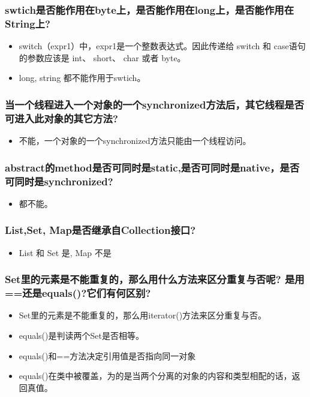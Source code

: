 \documentclass[9pt, b5paper]{article}
\begin{document}
\subsubsection{swtich是否能作用在byte上，是否能作用在long上，是否能作用在String上?}
\label{sec-1-1-42}
\begin{itemize}
\item switch（expr1）中，expr1是一个整数表达式。因此传递给 switch 和 case语句的参数应该是 int、 short、 char 或者 byte。
\item long, string 都不能作用于swtich。
\end{itemize}
\subsubsection{当一个线程进入一个对象的一个synchronized方法后，其它线程是否可进入此对象的其它方法?}
\label{sec-1-1-43}
\begin{itemize}
\item 不能，一个对象的一个synchronized方法只能由一个线程访问。
\end{itemize}
\subsubsection{abstract的method是否可同时是static,是否可同时是native，是否可同时是synchronized?}
\label{sec-1-1-44}
\begin{itemize}
\item 都不能。
\end{itemize}
\subsubsection{List,Set, Map是否继承自Collection接口?}
\label{sec-1-1-45}
\begin{itemize}
\item List 和 Set 是, Map 不是
\end{itemize}
\subsubsection{Set里的元素是不能重复的，那么用什么方法来区分重复与否呢? 是用==还是equals()?它们有何区别?}
\label{sec-1-1-46}
\begin{itemize}
\item Set里的元素是不能重复的，那么用iterator()方法来区分重复与否。
\item equals()是判读两个Set是否相等。
\item equals()和==方法决定引用值是否指向同一对象
\item equals()在类中被覆盖，为的是当两个分离的对象的内容和类型相配的话，返回真值。
\end{itemize}
\end{document}
